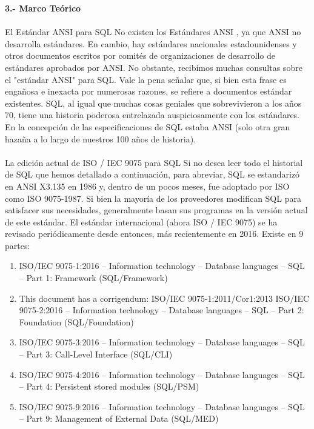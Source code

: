 \documentclass[preprint,12pt]{article}
\begin{document}
\begin{justify}
\textbf{3.- Marco Teórico}  \\\\ 
El Estándar ANSI para SQL No existen los Estándares ANSI , ya que ANSI no desarrolla estándares. En cambio, hay estándares nacionales estadounidenses y otros documentos escritos por comités de organizaciones de desarrollo de estándares aprobados por ANSI. No obstante, recibimos muchas consultas sobre el "estándar ANSI" para SQL. Vale la pena señalar que, si bien esta frase es engañosa e inexacta por numerosas razones, se refiere a documentos estándar existentes. SQL, al igual que muchas cosas geniales que sobrevivieron a los años 70, tiene una historia poderosa entrelazada auspiciosamente con los estándares. En la concepción de las especificaciones de SQL estaba ANSI (solo otra gran hazaña a lo largo de nuestros 100 años de historia).\\\\La edición actual de ISO / IEC 9075 para SQL Si no desea leer todo el historial de SQL que hemos detallado a continuación, para abreviar, SQL se estandarizó en ANSI X3.135 en 1986 y, dentro de un pocos meses, fue adoptado por ISO como ISO 9075-1987. Si bien la mayoría de los proveedores modifican SQL para satisfacer sus necesidades, generalmente basan sus programas en la versión actual de este estándar. El estándar internacional (ahora ISO / IEC 9075) se ha revisado periódicamente desde entonces, más recientemente en 2016. Existe en 9 partes:
	
\begin {enumerate}

\item ISO/IEC 9075-1:2016 – Information technology – Database languages – SQL – Part 1: Framework (SQL/Framework) 

\item This document has a corrigendum: ISO/IEC 9075-1:2011/Cor1:2013 
ISO/IEC 9075-2:2016 – Information technology – Database languages – SQL – Part 2: Foundation (SQL/Foundation) 

\item ISO/IEC 9075-3:2016 – Information technology – Database languages – SQL – Part 3: Call-Level Interface (SQL/CLI) 

\item ISO/IEC 9075-4:2016 – Information technology – Database languages – SQL – Part 4: Persistent stored modules (SQL/PSM) 

\item ISO/IEC 9075-9:2016 – Information technology – Database languages – SQL – Part 9: Management of External Data (SQL/MED) 


\end{enumerate}
\end{justify}
\end{document}
